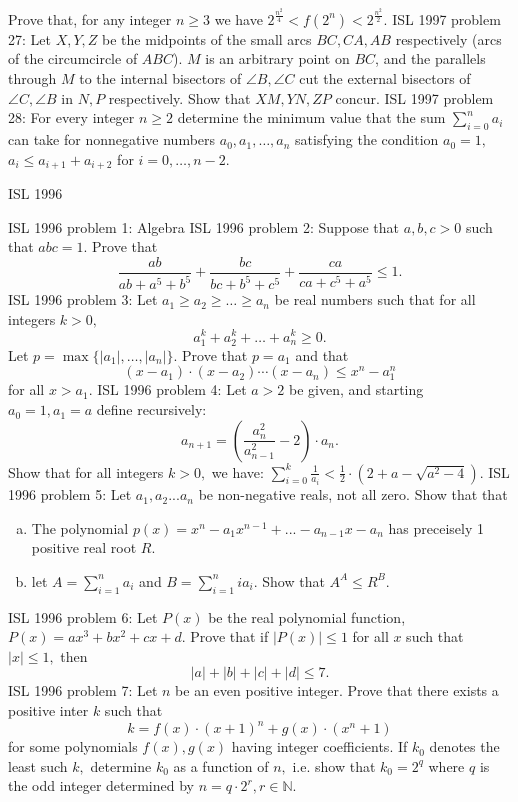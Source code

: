 Prove that, for any integer $ n \geq 3$ we have $ 2^{\frac {n^2}{4}} < f(2^n) < 2^{\frac {n^2}2}$. 
ISL 1997 problem 27:  Let $ X,Y,Z$ be the midpoints of the small arcs $ BC,CA,AB$ respectively (arcs of the circumcircle of $ ABC$). $ M$ is an arbitrary point on $ BC$, and the parallels through $ M$ to the internal bisectors of $ \angle B,\angle C$ cut the external bisectors of $ \angle C,\angle B$ in $ N,P$ respectively. Show that $ XM,YN,ZP$ concur. 
ISL 1997 problem 28:  For every integer $ n \geq 2$ determine the minimum value that the sum $ \sum^n_{i=0} a_i$ can take for nonnegative numbers $ a_0, a_1, \ldots, a_n$ satisfying the condition $ a_0 = 1,$ $ a_i \leq a_{i+1} + a_{i+2}$ for $ i = 0, \ldots, n - 2.$ 

ISL 1996 

ISL 1996 problem 1:  Algebra 
ISL 1996 problem 2:  Suppose that $a, b, c > 0$ such that $abc = 1$. Prove that
\[ \frac{ab}{ab + a^5 + b^5} + \frac{bc}{bc + b^5 + c^5} + \frac{ca}{ca + c^5 + a^5} \leq 1. \] 
ISL 1996 problem 3:  Let $ a_1 \geq a_2 \geq \ldots \geq a_n$ be real numbers such that for all integers $ k > 0,$
\[ a^k_1 + a^k_2 + \ldots + a^k_n \geq 0. \]
Let $ p =\max\{|a_1|, \ldots, |a_n|\}.$ Prove that $ p = a_1$ and that
\[ (x - a_1) \cdot (x - a_2) \cdots (x - a_n) \leq x^n - a^n_1 \]
for all $ x > a_1.$ 
ISL 1996 problem 4:  Let $ a > 2$ be given, and starting $ a_0 = 1, a_1 = a$ define recursively:
\[ a_{n+1} = \left(\frac{a^2_n}{a^2_{n-1}} - 2 \right) \cdot a_n. \]
Show that for all integers $ k > 0,$ we have: $ \sum^k_{i = 0} \frac{1}{a_i} < \frac12 \cdot (2 + a - \sqrt{a^2-4}).$ 
ISL 1996 problem 5:  Let $ a_1, a_2...a_n$ be non-negative reals, not all zero. Show that that
\begin{enumerate}[(a)]
  \item The polynomial $ p(x) = x^n - a_1x^{n - 1} + ... - a_{n - 1}x - a_n$ has preceisely 1 positive real root $ R$.
  \item let $ A = \sum_{i = 1}^n a_i$ and $ B = \sum_{i = 1}^n ia_i$. Show that $ A^A \leq R^B$.
\end{enumerate} 
ISL 1996 problem 6:  Let $ P(x)$ be the real polynomial function, $ P(x) = ax^3 + bx^2 + cx + d.$ Prove that if $ |P(x)| \leq 1$ for all $ x$ such that $ |x| \leq 1,$ then
\[ |a| + |b| + |c| + |d| \leq 7. \] 
ISL 1996 problem 7:  Let $ n$ be an even positive integer. Prove that there exists a positive inter $ k$ such that
\[ k = f(x) \cdot (x+1)^n + g(x) \cdot (x^n + 1) \]
for some polynomials $ f(x), g(x)$ having integer coefficients. If $ k_0$ denotes the least such $ k,$ determine $ k_0$ as a function of $ n,$ i.e. show that $ k_0 = 2^q$ where $ q$ is the odd integer determined by $ n = q \cdot 2^r, r \in \mathbb{N}.$ \\\\
